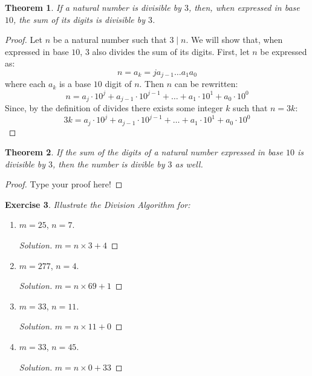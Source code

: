 \documentclass[12pt,leqno]{article}
\numberwithin{equation}{section}
\newtheorem{thm}{Theorem}[section]
\newtheorem{exer}[thm]{Exercise}
\theoremstyle{definition}
\begin{document}
\pagebreak
\begin{thm}
If a natural number is divisible by $3$, then, when expressed in
base $10$, the sum of its digits is divisible by $3$.
\end{thm}

\begin{proof}[Proof]
Let $n$ be a natural number such that $3 \mid n$.  We will show that, when expressed in base $10$, $3$ also divides the sum of its digits.  First, let $n$ be expressed as: 
\[n = a_k=j a_{j-1} \hdots a_1 a_0\]
where each $a_k$ is a base $10$ digit of $n$.  Then $n$ can be rewritten:
\[n = a_j \cdot 10^j + a_{j-1} \cdot 10^{j-1} + \hdots + a_1 \cdot 10^1 + a_0 \cdot 10^0\]
Since, by the definition of divides there exists some integer $k$ such that $n = 3k$:
\[3k = a_j \cdot 10^j + a_{j-1} \cdot 10^{j-1} + \hdots + a_1 \cdot 10^1 + a_0 \cdot 10^0\]


\end{proof}

\begin{thm}
If the sum of the digits of a natural number expressed in base $10$
is divisible by $3$, then the number is divible by $3$ as well.
\end{thm}

\begin{proof}[Proof]
Type your proof here!
\end{proof}

\setcounter{thm}{24}

\begin{exer} Illustrate the Division Algorithm for: \end{exer}
\begin{enumerate}
    \item[(1)] $m = 25$, $n = 7$.
    \begin{proof}[Solution]
    $m = n \times 3 + 4$
    \end{proof}

    \item[(2)] $m = 277$, $n = 4$.
    \begin{proof}[Solution]
    $m = n \times 69 + 1$
    \end{proof}

    \item[(3)] $m = 33$, $n = 11$.
    \begin{proof}[Solution]
    $m = n \times 11 + 0$
    \end{proof}

    \item[(4)] $m = 33$, $n = 45$.
    \begin{proof}[Solution]
    $m = n \times 0 + 33$
    \end{proof}

\end{enumerate}
\end{document}
